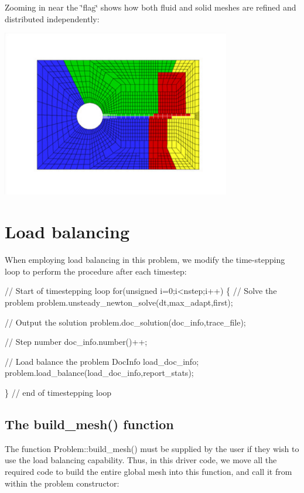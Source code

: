 Zooming in near the \char`\"{}flag\char`\"{} shows how both fluid and solid meshes are refined and distributed independently\+:

 
\begin{DoxyImage}
\includegraphics[width=0.75\textwidth]{turek_partition_zoom}
\end{DoxyImage}




 

\hypertarget{index_load_balance}{}\section{Load balancing}\label{index_load_balance}
When employing load balancing in this problem, we modify the time-\/stepping loop to perform the procedure after each timestep\+:

 
\begin{DoxyCodeInclude}
 \textcolor{comment}{// Start of timestepping loop}
 \textcolor{keywordflow}{for}(\textcolor{keywordtype}{unsigned} i=0;i<nstep;i++)
  \{ 
   \textcolor{comment}{// Solve the problem}
   problem.unsteady\_newton\_solve(dt,max\_adapt,first); 
   
   \textcolor{comment}{// Output the solution}
   problem.doc\_solution(doc\_info,trace\_file);
   
   \textcolor{comment}{// Step number}
   doc\_info.number()++;
   
   \textcolor{comment}{// Load balance the problem}
   DocInfo load\_doc\_info;
   problem.load\_balance(load\_doc\_info,report\_stats);

  \} \textcolor{comment}{// end of timestepping loop}

\end{DoxyCodeInclude}
\hypertarget{index_build_mesh}{}\subsection{The build\+\_\+mesh() function}\label{index_build_mesh}
The function {\ttfamily Problem\+::build\+\_\+mesh()} must be supplied by the user if they wish to use the load balancing capability. Thus, in this driver code, we move all the required code to build the entire global mesh into this function, and call it from within the problem constructor\+:

